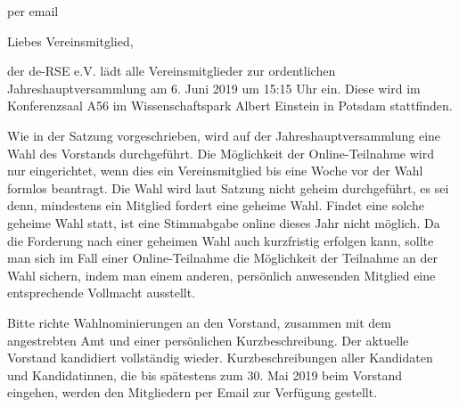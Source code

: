 \documentclass[../Vorlagen/de-RSE_Brief,a4paper]{scrlttr2}
\begin{document}

\begin{letter}{
    per email
}
\opening{Liebes Vereinsmitglied,}

der de-RSE e.V. lädt alle Vereinsmitglieder zur ordentlichen Jahreshauptversammlung am 6. Juni 2019 um 15:15 Uhr ein.
Diese wird im Konferenzsaal A56 im Wissenschaftspark Albert Einstein in Potsdam stattfinden.

Wie in der Satzung vorgeschrieben, wird auf der Jahreshauptversammlung eine Wahl des Vorstands durchgeführt.
Die Möglichkeit der Online-Teilnahme wird nur eingerichtet, wenn dies ein Vereinsmitglied bis eine Woche vor der Wahl formlos beantragt.
Die Wahl wird laut Satzung nicht geheim durchgeführt, es sei denn, mindestens ein Mitglied fordert eine geheime Wahl.
Findet eine solche geheime Wahl statt, ist eine Stimmabgabe online dieses Jahr nicht möglich.
Da die Forderung nach einer geheimen Wahl auch kurzfristig erfolgen kann, sollte man sich im Fall einer Online-Teilnahme die Möglichkeit der Teilnahme an der Wahl sichern, indem man einem anderen, persönlich anwesenden Mitglied eine entsprechende Vollmacht ausstellt.

Bitte richte Wahlnominierungen an den Vorstand, zusammen mit dem angestrebten Amt und einer persönlichen Kurzbeschreibung.
Der aktuelle Vorstand kandidiert vollständig wieder.
Kurzbeschreibungen aller Kandidaten und Kandidatinnen, die bis spätestens zum 30. Mai 2019 beim Vorstand eingehen, werden den Mitgliedern per Email zur Verfügung gestellt.


\end{letter}
\end{document}
